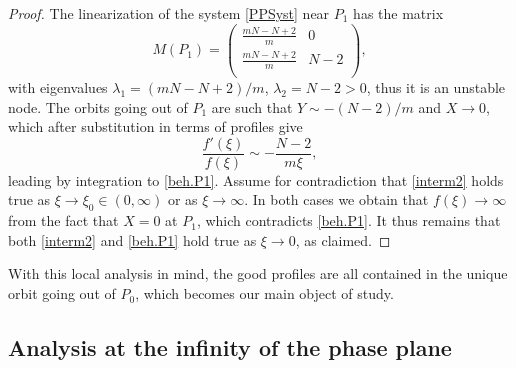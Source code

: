 \documentclass[a4paper,11pt]{article}
\numberwithin{equation}{section}
\begin{document}
\begin{proof}
The linearization of the system \eqref{PPSyst} near $P_1$ has the matrix
$$M(P_1)=\left(
  \begin{array}{cc}
    \frac{mN-N+2}{m} & 0 \\
    \frac{mN-N+2}{m} & N-2 \\
  \end{array}
\right),$$
with eigenvalues $\lambda_1=(mN-N+2)/m$, $\lambda_2=N-2>0$, thus it is an unstable node. The orbits going out of $P_1$ are such that $Y\sim-(N-2)/m$ and $X\to0$, which after substitution in terms of profiles give
\begin{equation}\label{interm2}
\frac{f'(\xi)}{f(\xi)}\sim-\frac{N-2}{m\xi},
\end{equation}
leading by integration to \eqref{beh.P1}. Assume for contradiction that \eqref{interm2} holds true as $\xi\to\xi_0\in(0,\infty)$ or as $\xi\to\infty$. In both cases we obtain that $f(\xi)\to\infty$ from the fact that $X=0$ at $P_1$, which contradicts \eqref{beh.P1}. It thus remains that both \eqref{interm2} and \eqref{beh.P1} hold true as $\xi\to0$, as claimed.
\end{proof}
With this local analysis in mind, the good profiles are all contained in the unique orbit going out of $P_0$, which becomes our main object of study.

\subsection{Analysis at the infinity of the phase plane}\label{subsec.infinity}
\end{document}
